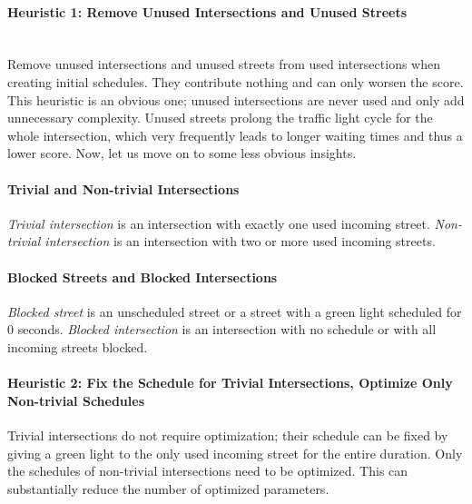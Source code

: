 \paragraph{Heuristic 1: Remove Unused Intersections and Unused Streets} \label{para:heuristic_1} \mbox{} \\
Remove unused intersections and unused streets from used intersections when creating initial schedules. They contribute nothing and can only worsen the score. \\

This heuristic is an obvious one; unused intersections are never used and only add unnecessary complexity. Unused streets prolong the traffic light cycle for the whole intersection, which very frequently leads to longer waiting times and thus a lower score. Now, let us move on to some less obvious insights.

\paragraph{Trivial and Non-trivial Intersections} \textit{Trivial intersection} is an intersection with exactly one used incoming street. \textit{Non-trivial intersection} is an intersection with two or more used incoming streets.

\paragraph{Blocked Streets and Blocked Intersections} \textit{Blocked street} is an unscheduled street or a street with a green light scheduled for 0 seconds. \textit{Blocked intersection} is an intersection with no schedule or with all incoming streets blocked.

\paragraph{Heuristic 2: Fix the Schedule for Trivial Intersections, Optimize Only Non-trivial Schedules} \label{para:heuristic_2}
Trivial intersections do not require optimization; their schedule can be fixed by giving a green light to the only used incoming street for the entire duration. Only the schedules of non-trivial intersections need to be optimized. This can substantially reduce the number of optimized parameters. \\

